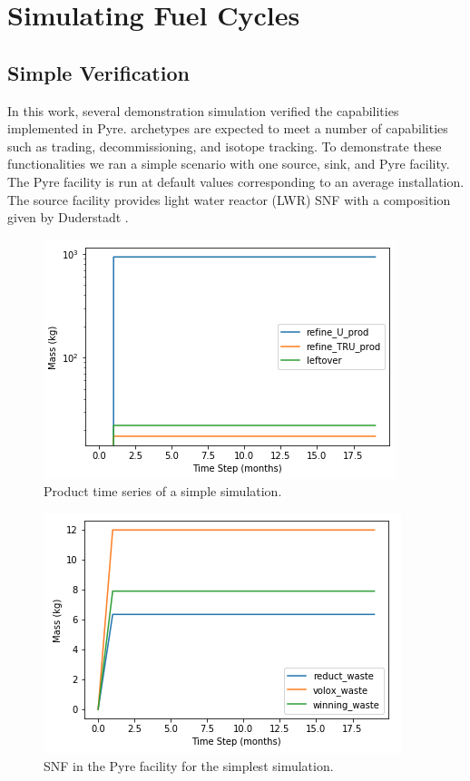 \chapter[Simulating Fuel Cycles]{Simulating Fuel Cycles}
\section{Simple Verification}
In this work, several demonstration simulation verified the capabilities implemented in Pyre. \Cyclus archetypes are expected to meet a number of capabilities such as trading, decommissioning, and isotope tracking.
To demonstrate these functionalities we ran a simple scenario with one source, sink, and Pyre facility. The Pyre facility is run at default values 
corresponding to an average installation. The source facility provides light water reactor (LWR) SNF with a composition given by Duderstadt \cite{duderstadt_nuclear_1976}. 

\FloatBarrier

\begin{figure} [h]
	\centering
	\includegraphics[width=0.65\linewidth]{images/timeseries-prod}
	\caption{Product time series of a simple simulation.}
	\label{fig:timeseries-prod}
\end{figure}



\begin{figure} [h]
	\centering
	\includegraphics[width=0.65\linewidth]{images/timeseries-waste}
	\caption{SNF in the Pyre facility for the simplest simulation.}
	\label{fig:timeseries-waste}
\end{figure}

